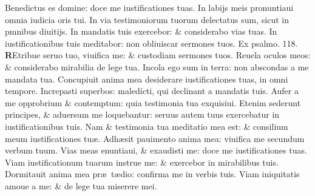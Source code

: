 \documentclass[a5paper,10pt]{book}
\def\ae{æ}
\begin{document}
\begin{multicols*}{2}
\newline \color{red} B\color{black}enedictus es domine: doce me iustificationes tuas.
\newline \color{red} I\color{black}n labijs meis pronuntiaui omnia iudicia oris tui.
\newline \color{red} I\color{black}n via testimoniorum tuorum delectatus sum, sicut in pmnibus diuitijs.
\newline \color{red} I\color{black}n mandatis tuis exercebor: \& considerabo vias tuas.
\newline \color{red} I\color{black}n iustificationibus tuis meditabor: non obliuiscar sermones tuos. 
\newline \color{red} Ex psalmo. 118. \color{black}
\vspace{-1em}
\lettrine[lines=2]{\bfseries \color{red} R}{}Etribue seruo tuo, viuifica me: \& custodiam sermones tuos.
\newline \color{red} R\color{black}euela oculos meos: \& considerabo mirabilia de lege tua.
\newline \color{red} I\color{black}ncola ego sum in terra: non abscondas a me mandata tua.
\newline \color{red} C\color{black}oncupiuit anima mea desiderare iustificationes tuas, in omni tempore.
\newline \color{red} I\color{black}ncrepasti superbos: maledícti, qui declinant a mandatis tuis.
\newline \color{red} A\color{black}ufer a me opprobrium \& contemptum: quia testimonia tua exquisiui.
\newline \color{red} E\color{black}tenim sederunt principes, \& aduersum me loquebantur: seruus autem tuus exercebatur in iustificationibus tuis.
\newline \color{red} N\color{black}am \& testimonia tua meditatio mea est: \& consilium meum iustificationes tu\ae .
\newline \color{red} A\color{black}dh\ae sit pauimento anima mea: viuifica me secundum verbum tuum.
\newline \color{red} V\color{black}ias meas enuntiaui, \& exaudisti me: doce me iustificationes tuas.
\newline \color{red} V\color{black}iam iustificationum tuarum instrue me: \& exercebor in mirabilibus tuis.
\newline \color{red} D\color{black}ormitauit anima mea pr\ae \ t\ae dio: confirma me in verbis tuis.
\newline \color{red} V\color{black}iam iniquitatis amoue a me: \& de lege tua miserere mei.

\end{multicols*}
\end{document}
